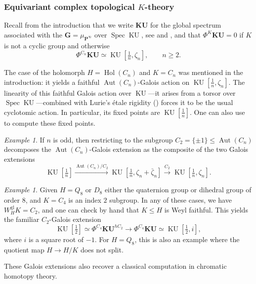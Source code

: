 \documentclass[11pt, a4paper]{article}
\newcommand{\gl}{\mathrm{gl}}
\DeclareMathOperator{\Spec}{Spec}
\newcommand{\1}{\mathbf{1}}
\DeclareMathOperator{\KU}{KU}
\newcommand{\gKU}{{\mathbf{KU}}}
\DeclareMathOperator{\Hol}{Hol}
\DeclareMathOperator{\Aut}{Aut}
\newcommand{\G}{\mathbf{G}}
\renewcommand{\P}{\mathbf{P}}
\theoremstyle{plain}
\theoremstyle{definition}
\theoremstyle{remark}\numberwithin{equation}{section}
\newtheorem{example}[equation]{Example}
\begin{document}
\subsubsection{Equivariant complex topological \texorpdfstring{$K$}{K}-theory}\label{sssec:KU}
Recall from the introduction that we write $\gKU$ for the global spectrum associated with the $\G = \mu_{\P^\infty}$ over $\Spec \KU$, see \cite[]{ec3} and \cite[Ex.5.1.4]{temperedglobal}, and that $\Phi^{K} \gKU = 0$ if $K$ is not a cyclic group and otherwise
\begin{equation}\label{eq:geoFP_KU}\Phi^{C_n} \gKU \simeq \KU[\tfrac{1}{n}, \zeta_n], \qquad n\geq 2.\end{equation}

The case of the holomorph $H=\Hol(C_n)$ and $K=C_n$ was mentioned in the introduction: it yields a faithful $\Aut(C_n)$-Galois action on $\KU[\tfrac{1}{n}, \zeta_n]$. The linearity of this faithful Galois action over $\KU$---it arises from a torsor over $\Spec \KU$---combined with Lurie's étale rigidity (\cite[Th.7.5.4.2]{ha}) forces it to be the usual cyclotomic action. In particular, its fixed points are $\KU[\tfrac{1}{n}]$. One can also use  to compute these fixed points.

\begin{example}\label{ex:universalKUexample}
    If $n$ is odd, then restricting to the subgroup $C_2 = \{\pm 1\}\leq \Aut(C_n)$ decomposes the $\Aut(C_n)$-Galois extension as the composite of the two Galois extensions
    \[\KU[\tfrac{1}{n}] \xrightarrow{\Aut(C_n)/C_2} \KU[\tfrac{1}{n}, \zeta_n + \bar{\zeta}_n] \xrightarrow{C_2} \KU[\tfrac{1}{n}, \zeta_n].\]
\end{example}

\begin{example}\label{ex:intro_KU_two}
    Given $H=Q_8$ or $D_8$ either the quaternion group or dihedral group of order $8$, and $K=C_4$ is an index $2$ subgroup. In any of these cases, we have $W_H^\gl K = C_2$, and one can check by hand that $K\leq H$ is Weyl faithful. This yields the familiar $C_2$-Galois extension
    \[\KU[\tfrac{1}{2}] \simeq \Phi^{C_4} \gKU^{hC_2} \to \Phi^{C_4} \gKU \simeq \KU[\tfrac{1}{2}, i],\]
    where $i$ is a square root of $-1$. For $H=Q_8$, this is also an example where the quotient map $H \to H/K$ does not split.
\end{example}

These Galois extensions also recover a classical computation in chromatic homotopy theory.
\end{document}
